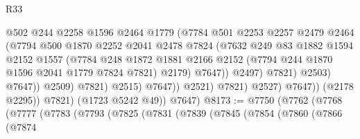 \begin{lexlean}{R33}
\begin{coremodule}
                                        @502
                                        @244
                                        @2258
                                        @1596
                                        @2464
                                        @1779
                                        (@7784
                                          @501
                                          @2253
                                          @2257
                                          @2479
                                          @2464
                                          (@7794
                                            @500
                                            @1870
                                            @2252
                                            @2041
                                            @2478
                                            @7824
                                            (@7632
                                              @249
                                              @83
                                              @1882
                                              @1594
                                              @2152
                                              @1557
                                              (@7784
                                                @248
                                                @1872
                                                @1881
                                                @2166
                                                @2152
                                                (@7794 @244 @1870 @1596 @2041 @1779 @7824 @7821)
                                                @2179)
                                              @7647))
                                          @2497)
                                        @7821)
                                      @2503)
                                    @7647))
                                @2509)
                              @7821)
                            @2515)
                          @7647))
                      @2521)
                    @7821)
                  @2527)
                @7647))
            (@2178 @2295))
          @7821)
        (@1723 @5242 @49))
      @7647)
@8173 := @7750
    (@7762
      (@7768
        (@7777
          (@7783
            (@7793
              (@7825
                (@7831
                  (@7839
                    (@7845
                      (@7854
                        (@7860
                          (@7866
                            (@7874

\end{coremodule}
\end{lexlean}
